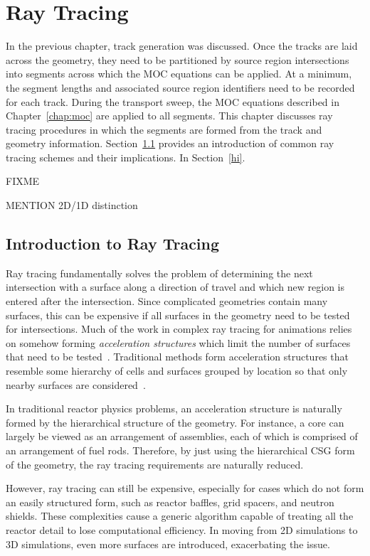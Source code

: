 \chapter{Ray Tracing}
\label{chap:ray-tracing}

In the previous chapter, track generation was discussed. Once the tracks are laid across the geometry, they need to be partitioned by source region intersections into segments across which the \ac{MOC} equations can be applied. At a minimum, the segment lengths and associated source region identifiers need to be recorded for each track. During the transport sweep, the \ac{MOC} equations described in Chapter~\ref{chap:moc} are applied to all segments. This chapter discusses ray tracing procedures in which the segments are formed from the track and geometry information. Section~\ref{sec:rt-intro} provides an introduction of common ray tracing schemes and their implications. In Section~\ref{hi}.

FIXME

MENTION 2D/1D distinction

\section{Introduction to Ray Tracing}
\label{sec:rt-intro}

Ray tracing fundamentally solves the problem of determining the next intersection with a surface along a direction of travel and which new region is entered after the intersection. Since complicated geometries contain many surfaces, this can be expensive if all surfaces in the geometry need to be tested for intersections. Much of the work in complex ray tracing for animations relies on somehow forming \textit{acceleration structures} which limit the number of surfaces that need to be tested~\cite{acceleration-structures}. Traditional methods form acceleration structures that resemble some hierarchy of cells and surfaces grouped by location so that only nearby surfaces are considered~\cite{acc-struct-hierarchy}.

In traditional reactor physics problems, an acceleration structure is naturally formed by the hierarchical structure of the geometry. For instance, a core can largely be viewed as an arrangement of assemblies, each of which is comprised of an arrangement of fuel rods. Therefore, by just using the hierarchical \ac{CSG} form of the geometry, the ray tracing requirements are naturally reduced.

However, ray tracing can still be expensive, especially for cases which do not form an easily structured form, such as reactor baffles, grid spacers, and neutron shields. These complexities cause a generic algorithm capable of treating all the reactor detail to lose computational efficiency. In moving from 2D simulations to 3D simulations, even more surfaces are introduced, exacerbating the issue.
	
